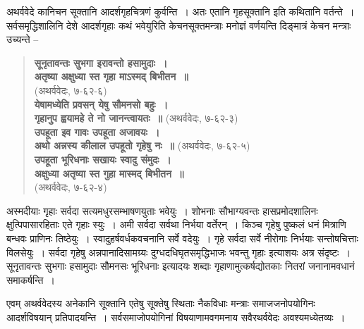 {अथर्ववेदे कानिचन सूक्तानि आदर्शगृहचित्रणं कुर्वन्ति~। अतः एतानि गृहसूक्तानि इति कथितानि वर्तन्ते~। सर्वसमृद्धिशालिनि देशे आदर्शगृहाः कथं भवेयुरिति केचनसूक्तमन्त्राः मनोज्ञं वर्णयन्ति दिङ्मात्रं केचन मन्त्राः उच्यन्ते –

\begin{verse}
\textbf{सूनृतावन्तः सुभगा इरावन्तो हसामुदाः~। }\\
\textbf{अतृष्या अक्षुध्या स्त गृहा माऽस्मद् बिभीतन~॥}\\
\hspace{6cm}(अथर्ववेदः, ७-६२-६)\\
\textbf{येषामध्येति प्रवसन् येषु सौमनसो बहुः~। }\\
\textbf{गृहानुप ह्वयामहे ते नो जानन्त्वायतः~॥} (अथर्ववेदः, ७-६२-३)\\
\textbf{उपहूता इव गावः उपहूता अजावयः~। }\\
\textbf{अथो अन्नस्य कीलाल उपहूतो गृहेषु नः~॥} (अथर्ववेदः, ७-६२-५)\\
\textbf{उपहूता भूरिधनाः सखायः स्वादु संमुदः~। }\\
\textbf{अक्षुध्या अतृष्या स्त गुहा मास्मद् बिभीतन~॥}\\
\hspace{5cm}(अथर्ववेदः, ७-६२-४)
\end{verse}

अस्मदीयाः गृहाः सर्वदा सत्यमधुरसम्भाषणयुताः भवेयुः~। शोभनाः सौभाग्यवन्तः हासप्रमोदशालिनः क्षुत्पिपासारहिताः एते गृहाः स्युः~। अमी सर्वदा सर्वथा निर्भया वर्तेरन्~। किञ्च गृहेषु पुष्कलं धनं मित्राणि बन्धवः प्राणिनः तिष्ठेयुः~। स्वादुहर्षवर्धकवचनानि सर्वे वदेयुः~। गृहे सर्वदा सर्वे नीरोगाः निर्भयाः सन्तोषचित्ताः विलसेयुः~। सर्वदा गृहेषु अन्नपानादिसामग्र्यः दुग्धदधिघृतसमृद्धिभाजः भवन्तु गृहाः इत्याशयः अत्र संदृष्टः~। सूनृतावन्तः सुभगाः हसामुदाः सौमनसः भूरिधनाः इत्यादयः शब्दाः गृहाणामुत्कर्षद्योतकाः नितरां जनानामवधानं समाकर्षन्ति~। 

एवम् अथर्ववेदस्य अनेकानि सूक्तानि एतेषु सूक्तेषु स्थिताः नैकविधाः मन्त्राः समाज\-जनोपयोगिनः आदर्शविषयान् प्रतिपादयन्ति~। सर्वसमाजोपयोगिनां विषयाणामवगमनाय सवैरथर्ववेदः अवश्यमध्येतव्यः~। 

\articleend
}

